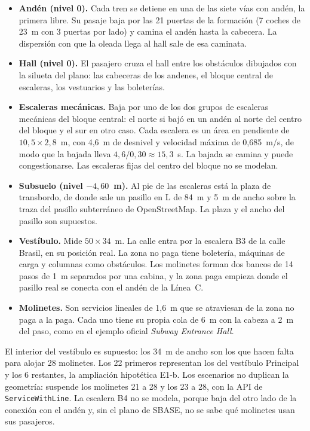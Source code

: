 \begin{itemize}
  \item \textbf{Andén (nivel 0).} Cada tren se detiene en una de las siete vías con andén, la primera libre. Su
        pasaje baja por las 21 puertas de la formación (7 coches de 23~m con 3 puertas por lado) y camina el
        andén hasta la cabecera. La dispersión con que la oleada llega al hall sale de esa caminata.
  \item \textbf{Hall (nivel 0).} El pasajero cruza el hall entre los obstáculos dibujados con la silueta del
        plano: las cabeceras de los andenes, el bloque central de escaleras, los vestuarios y las boleterías.
  \item \textbf{Escaleras mecánicas.} Baja por uno de los dos grupos de escaleras mecánicas del bloque central:
        el norte si bajó en un andén al norte del centro del bloque y el sur en otro caso. Cada escalera es un
        área en pendiente de $10{,}5 \times 2{,}8$~m, con 4,6~m de desnivel y velocidad máxima de 0,685~m/s, de
        modo que la bajada lleva $4{,}6/0{,}30 \approx 15{,}3$~s. La bajada se camina y puede congestionarse. Las
        escaleras fijas del centro del bloque no se modelan.
  \item \textbf{Subsuelo (nivel $-4{,}60$~m).} Al pie de las escaleras está la plaza de transbordo, de donde sale
        un pasillo en L de 84~m y 5~m de ancho sobre la traza del pasillo subterráneo de OpenStreetMap. La plaza
        y el ancho del pasillo son supuestos.
  \item \textbf{Vestíbulo.} Mide $50 \times 34$~m. La calle entra por la escalera B3 de la calle Brasil, en su
        posición real. La zona no paga tiene boletería, máquinas de carga y columnas como obstáculos. Los
        molinetes forman dos bancos de 14 pasos de 1~m separados por una cabina, y la zona paga empieza donde el
        pasillo real se conecta con el andén de la Línea~C.
  \item \textbf{Molinetes.} Son servicios lineales de 1,6~m que se atraviesan de la zona no paga a la paga. Cada
        uno tiene su propia cola de 6~m con la cabeza a 2~m del paso, como en el ejemplo oficial \emph{Subway
        Entrance Hall}.
\end{itemize}

El interior del vestíbulo es supuesto: los 34~m de ancho son los que hacen falta para alojar 28 molinetes. Los 22
primeros representan los del vestíbulo Principal y los 6 restantes, la ampliación hipotética E1-b. Los escenarios
no duplican la geometría: \EO{} suspende los molinetes 21 a 28 y \EI{} los 23 a 28, con la API de
\texttt{ServiceWithLine}. La escalera B4 no se modela, porque baja del otro lado de la conexión con el andén y,
sin el plano de SBASE, no se sabe qué molinetes usan sus pasajeros.

